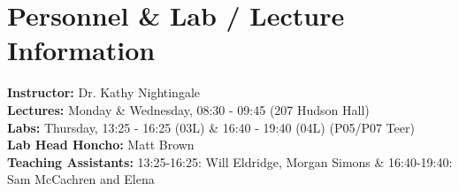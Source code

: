 \section{Personnel \& Lab / Lecture Information}
\textbf{Instructor:} Dr. Kathy Nightingale \\
\textbf{Lectures:} Monday \& Wednesday,  08:30 - 09:45 (207 Hudson Hall)\\
\textbf{Labs:} Thursday, 13:25 - 16:25 (03L) \& 16:40 - 19:40 (04L) (P05/P07 Teer)\\
\textbf{Lab Head Honcho:} Matt Brown\\
\textbf{Teaching Assistants:} 13:25-16:25: Will Eldridge, Morgan Simons \& 16:40-19:40: Sam McCachren and Elena\\ 
